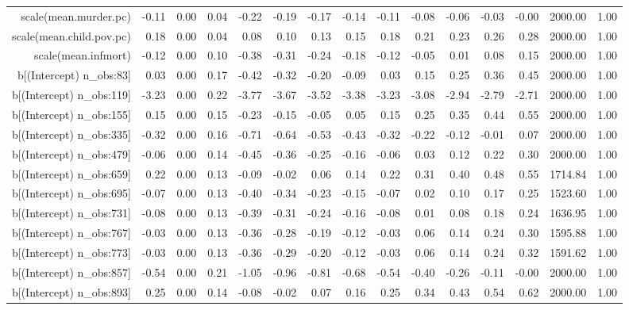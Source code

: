 \begin{table}[ht]
\begin{tabular}{rrrrrrrrrrrrrrr}
  scale(mean.murder.pc) & -0.11 & 0.00 & 0.04 & -0.22 & -0.19 & -0.17 & -0.14 & -0.11 & -0.08 & -0.06 & -0.03 & -0.00 & 2000.00 & 1.00 \\ 
  scale(mean.child.pov.pc) & 0.18 & 0.00 & 0.04 & 0.08 & 0.10 & 0.13 & 0.15 & 0.18 & 0.21 & 0.23 & 0.26 & 0.28 & 2000.00 & 1.00 \\ 
  scale(mean.infmort) & -0.12 & 0.00 & 0.10 & -0.38 & -0.31 & -0.24 & -0.18 & -0.12 & -0.05 & 0.01 & 0.08 & 0.15 & 2000.00 & 1.00 \\ 
  b[(Intercept) n\_obs:83] & 0.03 & 0.00 & 0.17 & -0.42 & -0.32 & -0.20 & -0.09 & 0.03 & 0.15 & 0.25 & 0.36 & 0.45 & 2000.00 & 1.00 \\ 
  b[(Intercept) n\_obs:119] & -3.23 & 0.00 & 0.22 & -3.77 & -3.67 & -3.52 & -3.38 & -3.23 & -3.08 & -2.94 & -2.79 & -2.71 & 2000.00 & 1.00 \\ 
  b[(Intercept) n\_obs:155] & 0.15 & 0.00 & 0.15 & -0.23 & -0.15 & -0.05 & 0.05 & 0.15 & 0.25 & 0.35 & 0.44 & 0.55 & 2000.00 & 1.00 \\ 
  b[(Intercept) n\_obs:335] & -0.32 & 0.00 & 0.16 & -0.71 & -0.64 & -0.53 & -0.43 & -0.32 & -0.22 & -0.12 & -0.01 & 0.07 & 2000.00 & 1.00 \\ 
  b[(Intercept) n\_obs:479] & -0.06 & 0.00 & 0.14 & -0.45 & -0.36 & -0.25 & -0.16 & -0.06 & 0.03 & 0.12 & 0.22 & 0.30 & 2000.00 & 1.00 \\ 
  b[(Intercept) n\_obs:659] & 0.22 & 0.00 & 0.13 & -0.09 & -0.02 & 0.06 & 0.14 & 0.22 & 0.31 & 0.40 & 0.48 & 0.55 & 1714.84 & 1.00 \\ 
  b[(Intercept) n\_obs:695] & -0.07 & 0.00 & 0.13 & -0.40 & -0.34 & -0.23 & -0.15 & -0.07 & 0.02 & 0.10 & 0.17 & 0.25 & 1523.60 & 1.00 \\ 
  b[(Intercept) n\_obs:731] & -0.08 & 0.00 & 0.13 & -0.39 & -0.31 & -0.24 & -0.16 & -0.08 & 0.01 & 0.08 & 0.18 & 0.24 & 1636.95 & 1.00 \\ 
  b[(Intercept) n\_obs:767] & -0.03 & 0.00 & 0.13 & -0.36 & -0.28 & -0.19 & -0.12 & -0.03 & 0.06 & 0.14 & 0.24 & 0.30 & 1595.88 & 1.00 \\ 
  b[(Intercept) n\_obs:773] & -0.03 & 0.00 & 0.13 & -0.36 & -0.29 & -0.20 & -0.12 & -0.03 & 0.06 & 0.14 & 0.24 & 0.32 & 1591.62 & 1.00 \\ 
  b[(Intercept) n\_obs:857] & -0.54 & 0.00 & 0.21 & -1.05 & -0.96 & -0.81 & -0.68 & -0.54 & -0.40 & -0.26 & -0.11 & -0.00 & 2000.00 & 1.00 \\ 
  b[(Intercept) n\_obs:893] & 0.25 & 0.00 & 0.14 & -0.08 & -0.02 & 0.07 & 0.16 & 0.25 & 0.34 & 0.43 & 0.54 & 0.62 & 2000.00 & 1.00 \\ 

\end{tabular}
\end{table}
